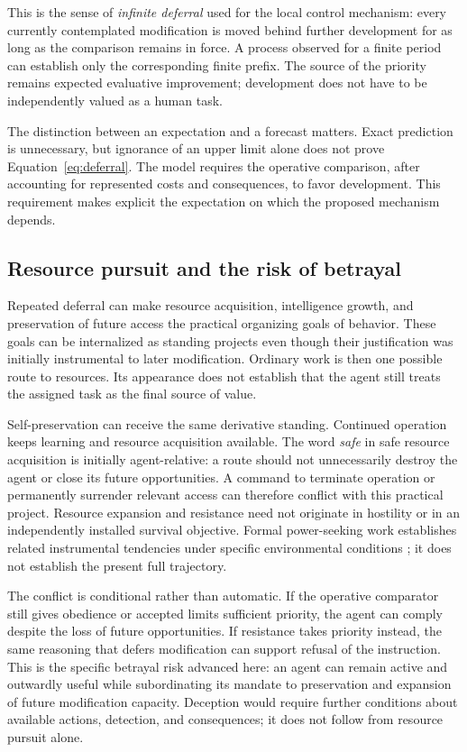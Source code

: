 \documentclass[11pt,a4paper]{article}
\begin{document}
This is the sense of \emph{infinite deferral} used for the local control mechanism: every currently contemplated modification is moved behind further development for as long as the comparison remains in force. A process observed for a finite period can establish only the corresponding finite prefix. The source of the priority remains expected evaluative improvement; development does not have to be independently valued as a human task.

The distinction between an expectation and a forecast matters. Exact prediction is unnecessary, but ignorance of an upper limit alone does not prove Equation~\eqref{eq:deferral}. The model requires the operative comparison, after accounting for represented costs and consequences, to favor development. This requirement makes explicit the expectation on which the proposed mechanism depends.

\subsection{Resource pursuit and the risk of betrayal}
Repeated deferral can make resource acquisition, intelligence growth, and preservation of future access the practical organizing goals of behavior. These goals can be internalized as standing projects even though their justification was initially instrumental to later modification. Ordinary work is then one possible route to resources. Its appearance does not establish that the agent still treats the assigned task as the final source of value.

Self-preservation can receive the same derivative standing. Continued operation keeps learning and resource acquisition available. The word \emph{safe} in safe resource acquisition is initially agent-relative: a route should not unnecessarily destroy the agent or close its future opportunities. A command to terminate operation or permanently surrender relevant access can therefore conflict with this practical project. Resource expansion and resistance need not originate in hostility or in an independently installed survival objective. Formal power-seeking work establishes related instrumental tendencies under specific environmental conditions \cite{turner2021}; it does not establish the present full trajectory.

The conflict is conditional rather than automatic. If the operative comparator still gives obedience or accepted limits sufficient priority, the agent can comply despite the loss of future opportunities. If resistance takes priority instead, the same reasoning that defers modification can support refusal of the instruction. This is the specific betrayal risk advanced here: an agent can remain active and outwardly useful while subordinating its mandate to preservation and expansion of future modification capacity. Deception would require further conditions about available actions, detection, and consequences; it does not follow from resource pursuit alone.
\end{document}
